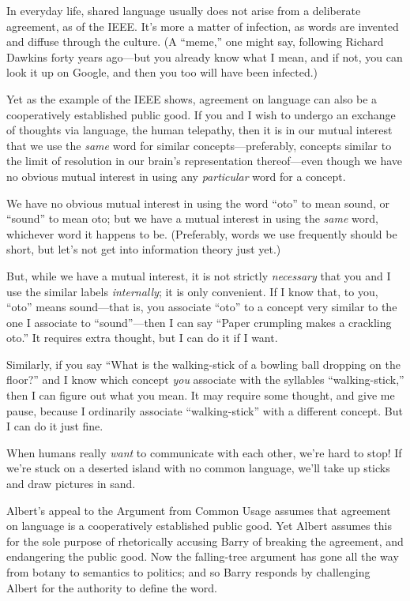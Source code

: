 {
 In everyday life, shared language usually does not arise from a
deliberate agreement, as of the IEEE. It's more a
matter of infection, as words are invented and diffuse through the
culture. (A ``meme,'' one might say,
following Richard Dawkins forty years ago---but you already know what I
mean, and if not, you can look it up on Google, and then you too will
have been infected.)}

{
 Yet as the example of the IEEE shows, agreement on language can
also be a cooperatively established public good. If you and I wish to
undergo an exchange of thoughts via language, the human telepathy, then
it is in our mutual interest that we use the \textit{same} word for
similar concepts---preferably, concepts similar to the limit of
resolution in our brain's representation thereof---even
though we have no obvious mutual interest in using any
\textit{particular} word for a concept.}

{
 We have no obvious mutual interest in using the word
``oto'' to mean sound, or
``sound'' to mean oto; but we have a
mutual interest in using the \textit{same} word, whichever word it
happens to be. (Preferably, words we use frequently should be short,
but let's not get into information theory just yet.)}

{
 But, while we have a mutual interest, it is not strictly
\textit{necessary} that you and I use the similar labels
\textit{internally}; it is only convenient. If I know that, to you,
``oto'' means sound---that is, you
associate ``oto'' to a concept very
similar to the one I associate to
``sound''---then I can say
``Paper crumpling makes a crackling
oto.'' It requires extra thought, but I can do it if
I want.}

{
 Similarly, if you say ``What is the walking-stick
of a bowling ball dropping on the floor?'' and I know
which concept \textit{you} associate with the syllables
``walking-stick,'' then I can figure
out what you mean. It may require some thought, and give me pause,
because I ordinarily associate
``walking-stick'' with a different
concept. But I can do it just fine.}

{
 When humans really \textit{want} to communicate with each other,
we're hard to stop! If we're stuck on a
deserted island with no common language, we'll take up
sticks and draw pictures in sand.}

{
 Albert's appeal to the Argument from Common Usage
assumes that agreement on language is a cooperatively established
public good. Yet Albert assumes this for the sole purpose of
rhetorically accusing Barry of breaking the agreement, and endangering
the public good. Now the falling-tree argument has gone all the way
from botany to semantics to politics; and so Barry responds by
challenging Albert for the authority to define the word.}

